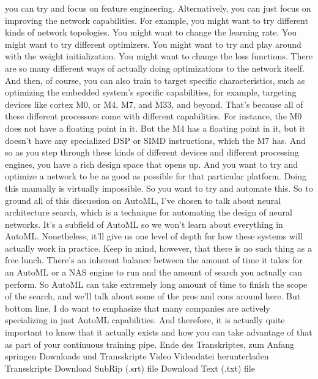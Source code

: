 {{{{    you can try and focus on feature engineering.
    Alternatively, you can just focus on improving the network capabilities.
    For example, you might want to try different kinds of network topologies.
    You might want to change the learning rate.
    You might want to try different optimizers.
    You might want to try and play around with the weight initialization.
    You might want to change the loss functions.
    There are so many different ways of actually doing optimizations
    to the network itself.
    And then, of course, you can also train to target specific characteristics,
    such as optimizing the embedded system's specific capabilities,
    for example, targeting devices like cortex M0, or M4, M7, and M33,
    and beyond.
    That's because all of these different processors
    come with different capabilities.
    For instance, the M0 does not have a floating point in it.
    But the M4 has a floating point in it, but it doesn't have any specialized DSP
    or SIMD instructions, which the M7 has.
    And so as you step through these kinds of different devices
    and different processing engines, you have a rich design space that opens up.
    And you want to try and optimize a network to be as good as possible
    for that particular platform.
    Doing this manually is virtually impossible.
    So you want to try and automate this.
    So to ground all of this discussion on AutoML,
    I've chosen to talk about neural architecture
    search, which is a technique for automating
    the design of neural networks.
    It's a subfield of AutoML so we won't learn about everything in AutoML.
    Nonetheless, it'll give us one level of depth for how these systems will
    actually work in practice.
    Keep in mind, however, that there is no such thing as a free lunch.
    There's an inherent balance between the amount of time
    it takes for an AutoML or a NAS engine to run and the amount of search
    you actually can perform.
    So AutoML can take extremely long amount of time
    to finish the scope of the search, and we'll talk about some
    of the pros and cons around here.
    But bottom line, I do want to emphasize that many companies are actively
    specializing in just AutoML capabilities.
    And therefore, it is actually quite important
    to know that it actually exists and how you
    can take advantage of that as part of your continuous training pipe.
    Ende des Transkriptes, zum Anfang springen
    Downloads und Transskripte
    Video
    Videodatei herunterladen
    Transskripte
    Download SubRip (.srt) file
    Download Text (.txt) file 
 
}}}}
